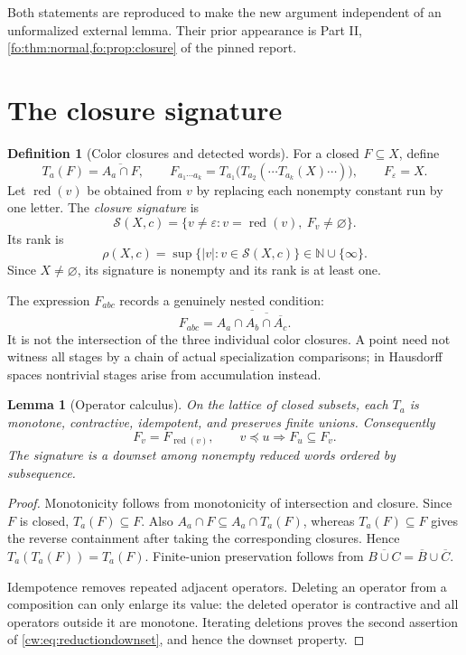 \documentclass[11pt,letterpaper]{article}
\numberwithin{equation}{section}
\newtheorem{lemma}[lemma]{Lemma}
\theoremstyle{definition}
\newtheorem{definition}[definition]{Definition}
\theoremstyle{remark}
\theoremstyle{definition}
\newcommand{\N}{\mathbb N}
\newcommand{\eps}{\varepsilon}
\newcommand{\red}{\operatorname{red}}
\newcommand{\len}[1]{\lvert #1\rvert}
\newcommand{\cwcl}[1]{\overline{#1}}
\newcommand{\cwSig}{\mathcal S}
\begin{document}
Both statements are reproduced to make the new argument independent of an
unformalized external lemma. Their prior appearance is Part II,
\cref{fo:thm:normal,fo:prop:closure} of the pinned report.

\section{The closure signature}
\label{cw:sec:signature}

\begin{definition}[Color closures and detected words]
For a closed $F\subseteq X$, define
\begin{equation}\label{cw:eq:colorclosure}
 T_a(F)=\cwcl{A_a\cap F},\qquad
 F_{a_1\cdots a_k}=T_{a_1}\bigl(T_{a_2}(\cdots T_{a_k}(X)\cdots)\bigr),
 \qquad F_{\eps}=X.
\end{equation}
Let $\red(v)$ be obtained from $v$ by replacing each nonempty constant run
by one letter. The \emph{closure signature} is
\begin{equation}\label{cw:eq:signature}
 \cwSig(X,c)=\{v\ne\eps:v=\red(v),\ F_v\ne\varnothing\}.
\end{equation}
Its rank is
\[
 \rho(X,c)=\sup\{\len{v}:v\in\cwSig(X,c)\}\in\N\cup\{\infty\}.
\]
Since $X\ne\varnothing$, its signature is nonempty and its rank is at least one.
\end{definition}

The expression $F_{abc}$ records a genuinely nested condition:
\[
 F_{abc}=\cwcl{A_a\cap\cwcl{A_b\cap\cwcl{A_c}}}.
\]
It is not the intersection of the three individual color closures. A point
need not witness all stages by a chain of actual specialization comparisons;
in Hausdorff spaces nontrivial stages arise from accumulation instead.

\begin{lemma}[Operator calculus]\label{cw:lem:operators}
On the lattice of closed subsets, each $T_a$ is monotone, contractive,
idempotent, and preserves finite unions. Consequently
\begin{equation}\label{cw:eq:reductiondownset}
 F_v=F_{\red(v)},\qquad v\preceq u\Longrightarrow F_u\subseteq F_v.
\end{equation}
The signature is a downset among nonempty reduced words ordered by subsequence.
\end{lemma}
\begin{proof}
Monotonicity follows from monotonicity of intersection and closure.
Since $F$ is closed, $T_a(F)\subseteq F$. Also
$A_a\cap F\subseteq A_a\cap T_a(F)$, whereas $T_a(F)\subseteq F$ gives the
reverse containment after taking the corresponding closures. Hence
$T_a(T_a(F))=T_a(F)$. Finite-union preservation follows from
$\cwcl{B\cup C}=\cwcl B\cup\cwcl C$.

Idempotence removes repeated adjacent operators. Deleting an operator from
a composition can only enlarge its value: the deleted operator is
contractive and all operators outside it are monotone. Iterating deletions
proves the second assertion of \eqref{cw:eq:reductiondownset}, and hence the
downset property.
\end{proof}
\end{document}
